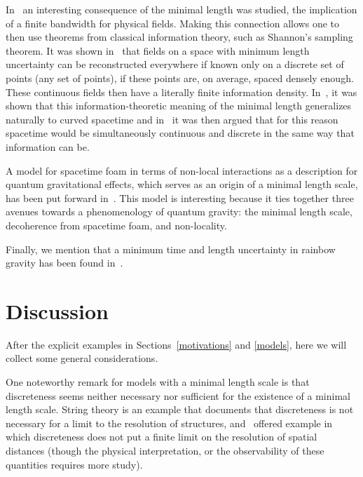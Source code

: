 \documentclass{article}
\begin{document}
In~\cite{Kempf:1999xt} an interesting consequence of the
minimal length was studied, the implication of a finite bandwidth for physical fields. Making this connection
allows one to then use theorems from classical information theory, such as Shannon's sampling
theorem. It was shown in~\cite{Kempf:1999xt} that fields on a space with minimum
length uncertainty can be reconstructed everywhere if known only on a
discrete set of points  (any set of points), if these points are, on average, spaced densely enough. These continuous 
fields then have a literally finite information density. In~\cite{Kempf:2003qu}, it was shown that this information-theoretic meaning of the minimal length generalizes naturally to curved spacetime and in~\cite{Kempf:2010rx} it was
then argued that for this reason spacetime
would be simultaneously continuous and discrete in the same way that
information can be.

A model for spacetime foam in terms of non-local
interactions as a description
for quantum gravitational effects, which serves as an origin of a minimal length scale, has been put forward 
in~\cite{Garay:1998wk,Garay:1998as}. This model is
interesting because it ties together three avenues towards a phenomenology of quantum gravity: the minimal
length scale, decoherence from spacetime foam, and non-locality.

Finally, we mention that a minimum time and length uncertainty in rainbow gravity has been
found in~\cite{Galan:2004st,Galan:2005ju,Galan:2006by}.


\newpage

\section{Discussion}
\label{disc}

After the explicit examples in Sections~\ref{motivations} and \ref{models},
 here we will collect some general considerations. 

One noteworthy remark for models with a minimal length scale is that discreteness seems neither necessary nor sufficient 
for the existence of a minimal length scale. String theory is an example that documents that discreteness is not
necessary for a limit to the resolution of structures, and~\cite{Bojowald:2011jd} offered
example in which discreteness does not put a finite limit on the resolution of spatial distances (though the
physical interpretation, or the observability of these quantities requires more study). 
\end{document}
